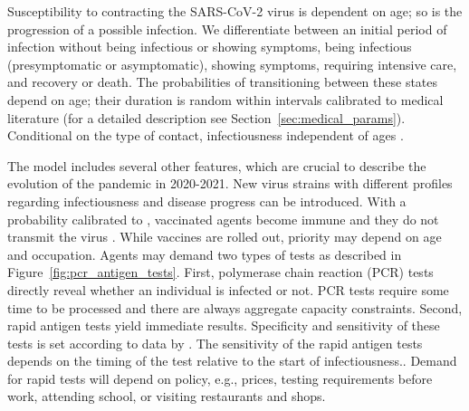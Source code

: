 Susceptibility to contracting the SARS-CoV-2 virus is dependent on age; so is the
progression of a possible infection. We differentiate between an initial period of
infection without being infectious or showing symptoms, being infectious (presymptomatic
or asymptomatic), showing symptoms, requiring intensive care, and recovery or death. The
probabilities of transitioning between these states depend on age; their duration is
random within intervals calibrated to medical literature (for a detailed description see
Section~\ref{sec:medical_params}).
Conditional on the type of contact, infectiousness independent of ages \citep{Jones2021}.

The model includes several other features, which are crucial to describe the evolution of
the pandemic in 2020-2021. New virus strains with different profiles regarding
infectiousness and disease progress can be introduced. With a probability calibrated to
\cite{Hunter2021}, vaccinated agents become immune and they do not
transmit the virus \citep{Petter2021, LevineTiefenbrun2021, Pritchard2021}.
While vaccines are rolled out, priority may depend on age and occupation. Agents may
demand two types of tests as described in Figure~\ref{fig:pcr_antigen_tests}. First,
polymerase chain reaction (PCR) tests directly reveal whether an individual is infected
or not. PCR tests require some time to be processed and there are always aggregate
capacity constraints. Second, rapid antigen tests yield immediate results. Specificity
and sensitivity of these tests is set according to data by \cite{Bruemmer2021, Smith2021}
. The sensitivity of the rapid antigen tests depends on the timing of the test relative
to the start of infectiousness.. Demand for rapid tests will depend on policy, e.g., prices, testing
requirements before work, attending school, or visiting restaurants and shops.

